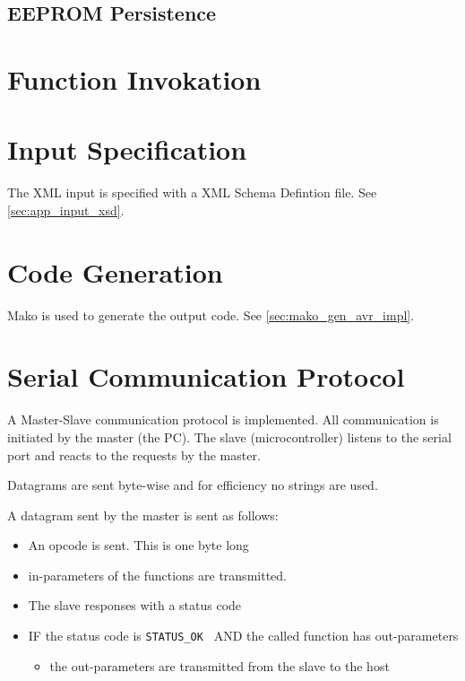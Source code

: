 \documentclass[a4paper,pdftex]{paper}
\begin{document}
\subsection{EEPROM Persistence}



\section{Function Invokation}

\section{Input Specification}
\label{sec:inspec}

The XML input is specified with a XML Schema Defintion file.
See \vref{sec:app_input_xsd}.

\section{Code Generation}

Mako is used to generate the output code.
See \vref{sec:mako_gen_avr_impl}.

\section{Serial Communication Protocol}

A Master-Slave communication protocol is implemented.  All
communication is initiated by the master (the PC).  The slave
(microcontroller) listens to the serial port and reacts to the
requests by the master.

Datagrams are sent byte-wise and for efficiency no strings are used.

A datagram sent by the master is sent as follows:

\begin{itemize}
\item An opcode is sent. This is one byte long
\item in-parameters of the functions are transmitted.
\item The slave responses with a status code
\item IF the status code is { \tt STATUS\_OK } AND the called function
  has out-parameters
  \begin{itemize}
  \item the out-parameters are transmitted from the slave to the host
  \end{itemize}
\end{itemize}
\end{document}
